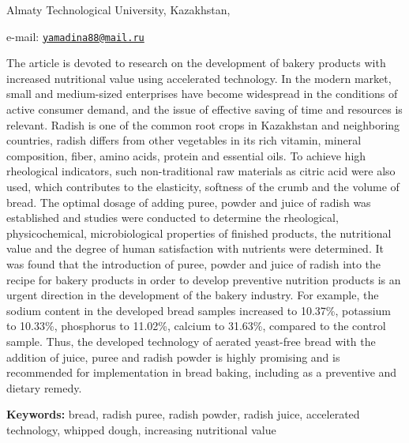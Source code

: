 \begin{affiliation}
Almaty Technological University, Kazakhstan,

e-mail: \href{mailto:yamadina88@mail.ru}{\nolinkurl{yamadina88@mail.ru}}
\end{affiliation}

The article is devoted to research on the development of bakery products
with increased nutritional value using accelerated technology. In the
modern market, small and medium-sized enterprises have become widespread
in the conditions of active consumer demand, and the issue of effective
saving of time and resources is relevant. Radish is one of the common
root crops in Kazakhstan and neighboring countries, radish differs from
other vegetables in its rich vitamin, mineral composition, fiber, amino
acids, protein and essential oils. To achieve high rheological
indicators, such non-traditional raw materials as citric acid were also
used, which contributes to the elasticity, softness of the crumb and the
volume of bread. The optimal dosage of adding puree, powder and juice of
radish was established and studies were conducted to determine the
rheological, physicochemical, microbiological properties of finished
products, the nutritional value and the degree of human satisfaction
with nutrients were determined. It was found that the introduction of
puree, powder and juice of radish into the recipe for bakery products in
order to develop preventive nutrition products is an urgent direction in
the development of the bakery industry. For example, the sodium content
in the developed bread samples increased to 10.37\%, potassium to
10.33\%, phosphorus to 11.02\%, calcium to 31.63\%, compared to the
control sample. Thus, the developed technology of aerated yeast-free
bread with the addition of juice, puree and radish powder is highly
promising and is recommended for implementation in bread baking,
including as a preventive and dietary remedy.

{\bfseries Keywords:} bread, radish puree, radish powder, radish juice,
accelerated technology, whipped dough, increasing nutritional value


